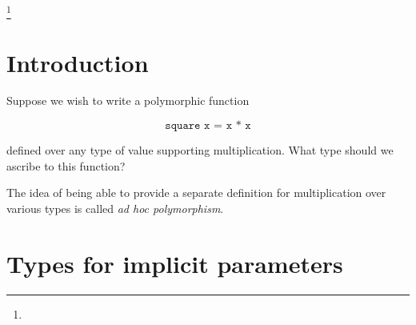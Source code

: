 \documentclass[acmlarge]{acmart}
\begin{document}
\newcommand\tmono{\tau}
\newcommand\tpoly{\sigma}
\newcommand\tvarempty{\epsilon_{\tpoly}}
\newcommand\tvar{\alpha}
\newcommand\tarrow[2]{#1 \rightarrow #2}
\newcommand\tforall[3]{\forall #1 \ . \ #2 \Rightarrow #3}
\newcommand\tgen[3]{\text{gen}\parens{#1, #2, #3}}
\newcommand\tinst[1]{\text{inst}(#1)}
\newcommand\tmgu[2]{\text{mgu}\parens{#1, #2}}

\newcommand\gcontext{\Gamma}
\newcommand\gempty{\epsilon_{\gcontext}}

\newcommand\icontext{\Delta}
\newcommand\iempty{\epsilon_{\icontext}}

\newcommand\ssub{\theta}
\newcommand\sempty{\epsilon_{\ssub}}
\newcommand\sub[3]{#1 \left[ #2 \mapsto #3 \right]}
\newcommand\slub[2]{#1 \vee #2}

\newcommand\utrans[2]{#1 \leadsto #2}
\newcommand\uelab[2]{#1 \hookrightarrow #2}
\newcommand\utovar[1]{\| #1 \|}



\terms{}



\thanks{
}


\maketitle

\section{Introduction}

  Suppose we wish to write a polymorphic function

  \[ \texttt{square x = x * x} \]

  \noindent defined over any type of value supporting multiplication. What type should we ascribe to this function?

  The idea of being able to provide a separate definition for multiplication over various types is called \emph{ad hoc polymorphism}.



\section{Types for implicit parameters}
\end{document}
